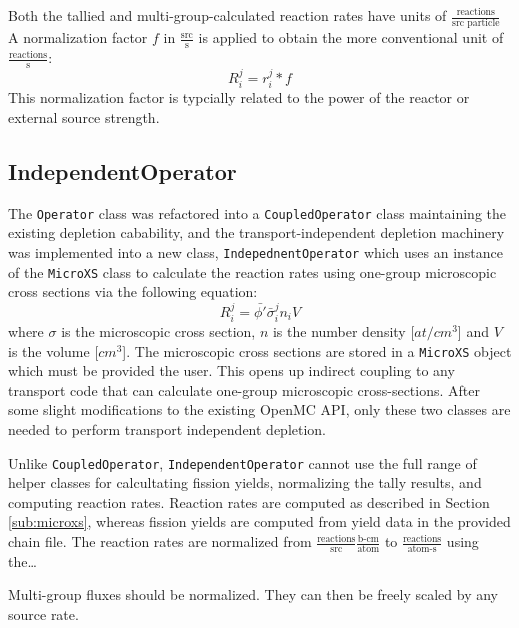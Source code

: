         Both the tallied and multi-group-calculated reaction rates have units of
        $\frac{\text{reactions}}{\text{src particle}}$
        A normalization factor $f$ in $\frac{\text{src}}{\text{s}}$ is applied
        to obtain the more conventional unit of
        $\frac{\text{reactions}}{\text{s}}$:
        \begin{equation}
            R^j_i = r^j_i * f
        \end{equation}
        This normalization factor is typcially related to the power of the
        reactor or external source strength.

    \subsection{IndependentOperator}
        The \verb.Operator. class was refactored into a \verb.CoupledOperator.
        class maintaining the existing depletion cabability, and the
        transport-independent depletion machinery was implemented into a new
        class, \verb.IndepednentOperator. which uses an instance of the
        \verb.MicroXS. class to calculate the reaction rates using one-group
        microscopic cross sections via the following equation:
        \begin{equation}
            R^j_i = \bar{\phi'} \bar{\sigma}^j_i n_i V
        \end{equation}
        where $\sigma$ is the microscopic cross section, $n$ is the number
        density [$at/cm^3$] and $V$ is the volume [$cm^3$]. The microscopic
        cross sections are stored in a \verb.MicroXS. object which must be
        provided the user. This opens up indirect coupling to any transport code
        that can calculate one-group microscopic cross-sections. After some
        slight modifications to the existing OpenMC API, only these two classes
        are needed to perform transport independent depletion.

        Unlike \verb.CoupledOperator., \verb.IndependentOperator. cannot use the
        full range of helper classes for calcultating fission yields,
        normalizing the tally results, and computing reaction rates. Reaction
        rates are computed as described in Section \ref{sub:microxs}, whereas
        fission yields are computed from yield data in the provided chain file.
        The reaction rates are normalized from
        $\frac{\text{reactions}}{\text{src}}\frac{\text{b-cm}}{\text{atom}}$ to
        $\frac{\text{reactions}}{\text{atom-s}}$ using the\ldots
        

        Multi-group fluxes should be normalized. They can then be freely scaled
        by any source rate.

